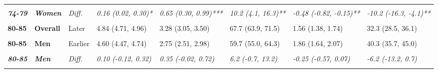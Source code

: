 \begin{table}[!h]
{{\begin{tabular}[t]{>{}l>{}lllllll}
\textbf{\cellcolor{gray!10}{74-79}} & \textbf{\cellcolor{gray!10}{Women}} & \cellcolor{gray!10}{Later} & \cellcolor{gray!10}{5.52 (5.43, 5.61)} & \cellcolor{gray!10}{3.49 (3.22, 3.76)} & \cellcolor{gray!10}{63.2 (58.5, 67.9)} & \cellcolor{gray!10}{2.03 (1.77, 2.29)} & \cellcolor{gray!10}{36.8 (32.1, 41.5)}\\
\cmidrule{1-8}
\em{\textbf{74-79}} & \em{\textbf{Women}} & \em{Diff.} & \em{0.16 (0.02, 0.30)*} & \em{0.65 (0.30, 0.99)***} & \em{10.2 (4.1, 16.3)**} & \em{-0.48 (-0.82, -0.15)**} & \em{-10.2 (-16.3, -4.1)**}\\
\cmidrule{1-8}
\textbf{\cellcolor{gray!10}{80-85}} & \textbf{\cellcolor{gray!10}{Overall}} & \cellcolor{gray!10}{Earlier} & \cellcolor{gray!10}{4.74 (4.64, 4.85)} & \cellcolor{gray!10}{2.76 (2.57, 2.94)} & \cellcolor{gray!10}{58.1 (54.7, 61.6)} & \cellcolor{gray!10}{1.98 (1.82, 2.15)} & \cellcolor{gray!10}{41.9 (38.4, 45.3)}\\
\cmidrule{1-8}
\textbf{80-85} & \textbf{Overall} & Later & 4.84 (4.71, 4.96) & 3.28 (3.05, 3.50) & 67.7 (63.9, 71.5) & 1.56 (1.38, 1.74) & 32.3 (28.5, 36.1)\\
\cmidrule{1-8}
\em{\textbf{\cellcolor{gray!10}{80-85}}} & \em{\textbf{\cellcolor{gray!10}{Overall}}} & \em{\cellcolor{gray!10}{Diff.}} & \em{\cellcolor{gray!10}{0.09 (-0.07, 0.25)}} & \em{\cellcolor{gray!10}{0.52 (0.23, 0.81)***}} & \em{\cellcolor{gray!10}{9.6 (4.4, 14.7)***}} & \em{\cellcolor{gray!10}{-0.42 (-0.67, -0.18)***}} & \em{\cellcolor{gray!10}{-9.6 (-14.7, -4.4)***}}\\
\cmidrule{1-8}
\textbf{80-85} & \textbf{Men} & Earlier & 4.60 (4.47, 4.74) & 2.75 (2.51, 2.98) & 59.7 (55.0, 64.3) & 1.86 (1.64, 2.07) & 40.3 (35.7, 45.0)\\
\cmidrule{1-8}
\textbf{\cellcolor{gray!10}{80-85}} & \textbf{\cellcolor{gray!10}{Men}} & \cellcolor{gray!10}{Later} & \cellcolor{gray!10}{4.70 (4.53, 4.88)} & \cellcolor{gray!10}{3.10 (2.81, 3.38)} & \cellcolor{gray!10}{65.9 (60.8, 71.0)} & \cellcolor{gray!10}{1.60 (1.37, 1.84)} & \cellcolor{gray!10}{34.1 (29.0, 39.2)}\\
\cmidrule{1-8}
\em{\textbf{80-85}} & \em{\textbf{Men}} & \em{Diff.} & \em{0.10 (-0.12, 0.32)} & \em{0.35 (-0.02, 0.72)} & \em{6.2 (-0.7, 13.2)} & \em{-0.25 (-0.57, 0.07)} & \em{-6.2 (-13.2, 0.7)}\\
\cmidrule{1-8}
\textbf{\cellcolor{gray!10}{80-85}} & \textbf{\cellcolor{gray!10}{Women}} & \cellcolor{gray!10}{Earlier} & \cellcolor{gray!10}{4.86 (4.72, 4.99)} & \cellcolor{gray!10}{2.77 (2.54, 3.00)} & \cellcolor{gray!10}{57.0 (52.6, 61.3)} & \cellcolor{gray!10}{2.09 (1.88, 2.30)} & \cellcolor{gray!10}{43.0 (38.7, 47.4)}\\

\end{tabular}}}
\end{table}
